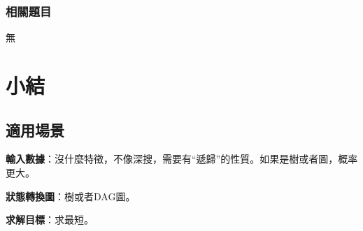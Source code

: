\subsubsection{相關題目}

\begindot
\item 無
\myenddot


\section{小結} %
\label{sec:bfs-template}


\subsection{適用場景}

\textbf{輸入數據}：沒什麼特徵，不像深搜，需要有“遞歸”的性質。如果是樹或者圖，概率更大。

\textbf{狀態轉換圖}：樹或者DAG圖。

\textbf{求解目標}：求最短。


